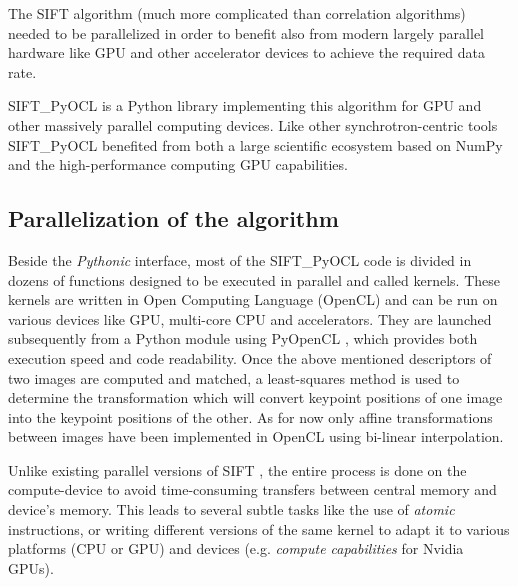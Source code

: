 \documentclass[preprint]{iucr}
\begin{document}
The SIFT algorithm (much more complicated than correlation algorithms) needed
to be parallelized in order to benefit also from modern largely parallel
hardware like GPU and other accelerator devices to achieve the required data
rate.

SIFT\_PyOCL is a Python library implementing this algorithm for GPU
and other massively parallel computing devices.
Like other synchrotron-centric tools \cite{pyhst2,pynx,pyfai} SIFT\_PyOCL
benefited from both a large scientific ecosystem based on NumPy \cite{numpy}
and the high-performance computing GPU capabilities.





\subsection{Parallelization of the algorithm}
Beside the \emph{Pythonic} interface, most of the
SIFT\_PyOCL code is divided in dozens of functions designed to be
executed in parallel and called kernels. These kernels are written in Open
Computing Language (OpenCL) \cite{opencl} and  can be run on various
devices like GPU, multi-core CPU and accelerators.
They are launched subsequently from a Python module using PyOpenCL
\cite{pyopencl}, which provides both execution speed and code readability.
Once the above mentioned descriptors of two images are computed and matched, a
least-squares method is used to determine the transformation which will convert
keypoint positions of one image into the keypoint positions of the other.
As for now only affine transformations between images have been implemented in
OpenCL using bi-linear interpolation.

Unlike existing parallel versions of SIFT \cite{lu,rister,vasilyev}, the entire
process is done on the compute-device to avoid time-consuming transfers between
central memory and device's memory.
This leads to several subtle tasks like the use of \emph{atomic} instructions,
or writing different versions of the same kernel to adapt it to various
platforms (CPU or GPU) and devices (e.g. \emph{compute capabilities} for
Nvidia GPUs).
\end{document}
